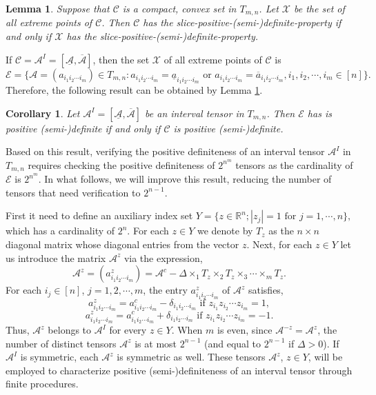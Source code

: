 \documentclass[twoside]{article}
\newtheorem{lemma}{Lemma}[section]
\newtheorem{corollary}{Corollary}[section]
\begin{document}
\begin{lemma}\label{lep}\textup{\cite{sr2020}}
Suppose that $\mathcal{C}$ is a compact, convex set in $T_{m,n}$. Let $\mathcal{X}$ be the set of all extreme points of $\mathcal{C}$. Then $\mathcal{C}$ has the slice-positive-(semi-)definite-property if and only if $\mathcal{X}$ has the slice-positive-(semi-)definite-property.
\end{lemma}



If $\mathcal{C}=\mathcal{A}^I=[\underline{\mathcal{A}},\overline{\mathcal{A}}]$, then the set $\mathcal{X}$ of all extreme points of $\mathcal{C}$ is $$\mathcal{E}=\{\mathcal{A}=(a_{i_1i_2\cdots i_m})\in T_{m,n}:a_{i_1i_2\cdots i_m}=\underline{a}_{i_1i_2\cdots i_m} \mbox{ or } a_{i_1i_2\cdots i_m}=\overline{a}_{i_1i_2\cdots i_m}, i_1,i_2,\cdots, i_m\in[n]\}.$$
Therefore, the following result can be obtained by Lemma \ref{lep}.

\begin{corollary}\label{cor1}
Let $\mathcal{A}^I=[\underline{\mathcal{A}},\overline{\mathcal{A}}]$ be an interval tensor in $T_{m,n}$. Then $\mathcal{E}$ has is positive (semi-)definite if and only if $\mathcal{C}$ is positive (semi-)definite.
\end{corollary}

Based on this result, verifying the positive definiteness of an interval tensor $\mathcal{A}^I$ in $T_{m,n}$ requires checking the positive definiteness of $2^{n^m}$ tensors as the cardinality of $\mathcal{E}$ is $2^{n^m}$. In what follows, we will improve this result, reducing the number of tensors that need verification to $2^{n-1}$.

First it need to define an auxiliary index set
$Y= \{z\in \mathbb{R}^n; |z_j|=1 \mbox{ for } j=1,\cdots,n\},$
which has a cardinality of $2^n$. For each $z\in Y$ we denote by $T_z$ as the $n\times n$ diagonal matrix whose diagonal entries from the vector $z$. Next, for each $z\in Y$ let us introduce the matrix $\mathcal{A}^z$ via the expression,
$$\mathcal{A}^z=(a^z_{i_1i_2\cdots i_m})=\mathcal{A}^c-\Delta\times_1 T_z\times_2 T_z\times_3\cdots\times_m T_z.$$
For each $i_j\in[n]$, $j=1,2,\cdots,m$, the entry $a^z_{i_1i_2\cdots i_m}$ of $\mathcal{A}^z$ satisfies,
 $$a^z_{i_1i_2\cdots i_m}=a^c_{i_1i_2\cdots i_m}- \delta_{i_1i_2\cdots i_m}\mbox{ if }z_{i_1}z_{i_2}\cdots z_{i_m}=1,$$
 $$a^z_{i_1i_2\cdots i_m}=a^c_{i_1i_2\cdots i_m}+ \delta_{i_1i_2\cdots i_m}\mbox{ if }z_{i_1}z_{i_2}\cdots z_{i_m}=-1.$$
 Thus, $\mathcal{A}^z$ belongs to $\mathcal{A}^I$ for every $z\in Y$. When $m$ is even, since $\mathcal{A}^{-z}=\mathcal{A}^z$, the number of distinct tensors $\mathcal{A}^z$ is at most $2^{n-1}$ (and equal to $2^{n-1}$ if $\Delta> 0$). If $\mathcal{A}^I$ is symmetric, each $\mathcal{A}^z$ is symmetric as well. These tensors $\mathcal{A}^z$, $z\in Y$, will be employed to characterize positive (semi-)definiteness of an interval tensor through finite procedures.
\end{document}

